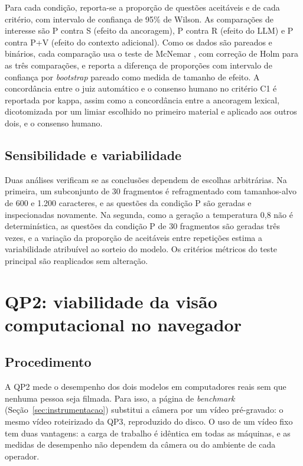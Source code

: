 \documentclass[portuguese,oneside]{tcc}
\newcommand{\estr}[1]{\emph{#1}}
\begin{document}
Para cada condição, reporta-se a proporção de questões aceitáveis e de cada critério, com intervalo de confiança de 95\% de Wilson. As comparações de interesse são P contra S (efeito da ancoragem), P contra R (efeito do LLM) e P contra P+V (efeito do contexto adicional). Como os dados são pareados e binários, cada comparação usa o teste de McNemar \cite{McN47}, com correção de Holm para as três comparações, e reporta a diferença de proporções com intervalo de confiança por \estr{bootstrap} pareado como medida de tamanho de efeito. A concordância entre o juiz automático e o consenso humano no critério C1 é reportada por kappa, assim como a concordância entre a ancoragem lexical, dicotomizada por um limiar escolhido no primeiro material e aplicado aos outros dois, e o consenso humano.

\subsection{Sensibilidade e variabilidade}

Duas análises verificam se as conclusões dependem de escolhas arbitrárias. Na primeira, um subconjunto de 30 fragmentos é refragmentado com tamanhos-alvo de 600 e 1.200 caracteres, e as questões da condição P são geradas e inspecionadas novamente. Na segunda, como a geração a temperatura 0,8 não é determinística, as questões da condição P de 30 fragmentos são geradas três vezes, e a variação da proporção de aceitáveis entre repetições estima a variabilidade atribuível ao sorteio do modelo. Os critérios métricos do teste principal são reaplicados sem alteração.

\section{\label{sec:met-qp2}QP2: viabilidade da visão computacional no navegador}

\subsection{Procedimento}

A QP2 mede o desempenho dos dois modelos em computadores reais sem que nenhuma pessoa seja filmada. Para isso, a página de \estr{benchmark} (Seção~\ref{sec:instrumentacao}) substitui a câmera por um vídeo pré-gravado: o mesmo vídeo roteirizado da QP3, reproduzido do disco. O uso de um vídeo fixo tem duas vantagens: a carga de trabalho é idêntica em todas as máquinas, e as medidas de desempenho não dependem da câmera ou do ambiente de cada operador.
\end{document}
